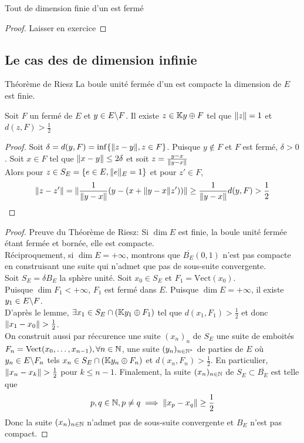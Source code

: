 \documentclass[]{report}
\begin{document}
    \begin{cor}{}{}
        Tout \sev de dimension finie d'un \evn est fermé
    \end{cor}

    \begin{proof}
        Laisser en exercice
    \end{proof}

    \subsection*{Le cas des \evn de dimension infinie}

    \begin{tm}{Théorème de Riesz}{}
        La boule unité fermée d'un \evn est compacte \ssi la dimension de $E$ est finie.
    \end{tm}

    \begin{lm}{}{}
        Soit $F$ un \sev fermé de $E$ et $y\in E\backslash F$. Il existe $z\in \mathbb{K} y\oplus F$ tel que $\lVert z \rVert=1$ et $d(z,F)>\frac{1}{2}$
    \end{lm}

    \begin{proof}
        Soit $\delta=d(y,F)=\inf \{\lVert z-y \rVert,z\in F\}$. Puisque $y\not \in F$ et $F$ est fermé, $\delta>0$. Soit $x\in F$ tel que $\lVert x-y \rVert\le 2\delta$ et soit $z=\frac{y-x}{\lVert y-x \rVert}$\\
        Alors pour $z\in S_E=\{e\in E,\lVert e \rVert_E=1\}$ et pour $z'\in F$,
        \[\lVert z-z' \rVert=\lVert \frac{1}{\lVert y-x \rVert}(y-(x+\lVert y-x \rVert z')) \rVert\ge \frac{1}{\lVert y-x \rVert}d(y,F)>\frac{1}{2}\]
    \end{proof}

    \begin{proof}
        Preuve du Théorème de Riesz: Si $\dim E$ est finie, la boule unité fermée étant fermée et bornée, elle est compacte.\\
        Réciproquement, si $\dim E=+\infty$, montrons que $\overline{B_E}(0,1)$ n'est pas compacte en construisant une suite qui n'admet que pas de sous-suite convergente.\\
        Soit $S_E=\delta B_E$ la sphère unité. Soit $x_0\in S_E$ et $F_1=\text{Vect}(x_0)$.\\
        Puisque $\dim F_1<+\infty$, $F_1$ est fermé dans $E$. Puisque $\dim E=+\infty$, il existe $y_1\in E\backslash F$.\\
        D'après le lemme, $\exists x_1\in S_E\cap (\mathbb{K} y_1\oplus F_1)$ tel que $d(x_1,F_1)>\frac{1}{2}$ et donc $\lVert x_1-x_0 \rVert>\frac{1}{2}$.\\
        On construit aussi par réccurence une suite $(x_n)_n$ de $S_E$ une suite de \sev emboités $F_n=\text{Vect}(x_0,\ldots,x_{n-1}),\forall n\in \mathbb{N}$, une suite $(y_n)_{n\in\mathbb{N}^*}$ de parties de $E$ où $y_n\in E\backslash F_n$ tels $x_n\in S_E\cap (\mathbb{K} y_n\oplus F_n)$ et $d(x_n,F_n)>\frac{1}{2}$. En particulier, $\lVert x_n-x_k \rVert>\frac{1}{2}$ pour $k\le n-1$. Finalement, la suite $(x_n)_{n\in\mathbb{N}}$ de $S_E\subset \overline{B_E}$ est telle que
        \[p,q\in \mathbb{N},p\neq q\implies \lVert x_p-x_q \rVert\ge \frac{1}{2}\]
        Donc la suite $(x_n)_{n\in\mathbb{N}}$ n'admet pas de sous-suite convergente et $B_E$ n'est pas compact.
    \end{proof}
\end{document}
